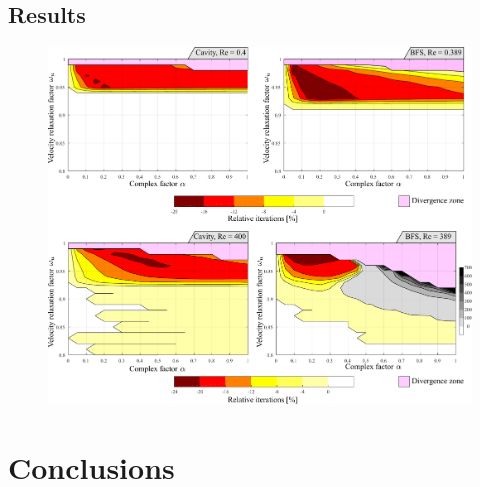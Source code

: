 \documentclass[final,3p,times,10pt,onecolumn]{myElsarticle}
\numberwithin{equation}{section}
\begin{document}
\subsection{Results}

\begin{figure}[H]
\centering
\includegraphics[width=17cm]{fig/Results/FactorLowRe.pdf}
\caption{}
\label{Fig:Geometria3}
\end{figure}









\section{Conclusions}
\label{sec:conclusions}
\end{document}
